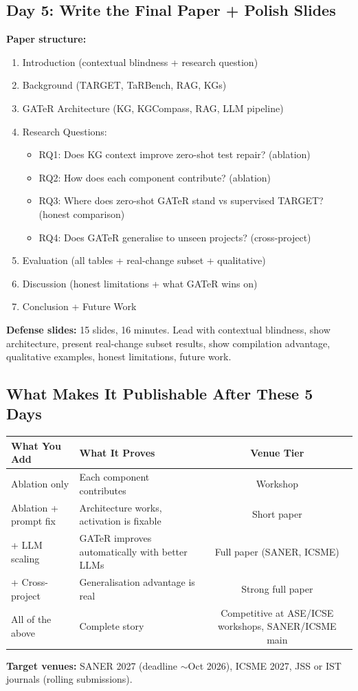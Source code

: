 \documentclass[11pt,a4paper]{article}
\begin{document}
\subsection*{Day 5: Write the Final Paper + Polish Slides}

\textbf{Paper structure:}
\begin{enumerate}[nosep,leftmargin=1.5em]
  \item Introduction (contextual blindness + research question)
  \item Background (TARGET, TaRBench, RAG, KGs)
  \item GATeR Architecture (KG, KGCompass, RAG, LLM pipeline)
  \item Research Questions:
    \begin{itemize}[nosep]
      \item RQ1: Does KG context improve zero-shot test repair?
            (ablation)
      \item RQ2: How does each component contribute? (ablation)
      \item RQ3: Where does zero-shot GATeR stand vs supervised
            TARGET? (honest comparison)
      \item RQ4: Does GATeR generalise to unseen projects?
            (cross-project)
    \end{itemize}
  \item Evaluation (all tables + real-change subset + qualitative)
  \item Discussion (honest limitations + what GATeR wins on)
  \item Conclusion + Future Work
\end{enumerate}

\textbf{Defense slides:} 15 slides, 16 minutes.  Lead with
contextual blindness, show architecture, present real-change
subset results, show compilation advantage, qualitative examples,
honest limitations, future work.

\subsection*{What Makes It Publishable After These 5 Days}

\begin{table}[h!]
\centering\small
\begin{tabularx}{\textwidth}{|l|X|c|}
\hline
\textbf{What You Add} & \textbf{What It Proves} & \textbf{Venue Tier} \\
\hline
Ablation only & Each component contributes & Workshop \\
\hline
Ablation + prompt fix & Architecture works, activation
  is fixable & Short paper \\
\hline
+ LLM scaling & GATeR improves automatically with
  better LLMs & Full paper (SANER, ICSME) \\
\hline
+ Cross-project & Generalisation advantage is real &
  Strong full paper \\
\hline
All of the above & Complete story &
  Competitive at ASE/ICSE workshops, SANER/ICSME main \\
\hline
\end{tabularx}
\end{table}

\textbf{Target venues:} SANER 2027 (deadline $\sim$Oct 2026),
ICSME 2027, JSS or IST journals (rolling submissions).
\end{document}
